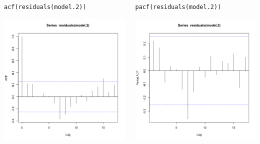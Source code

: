 \documentclass{beamer}
\begin{document}
\begin{frame}[fragile]{}
    \begin{columns}
        \begin{column}{0.5\textwidth}
            \begin{verbatim}
acf(residuals(model.2))
            \end{verbatim}
            \includegraphics[width=\textwidth]{lectures/day_4_GLS/figures/unnamed-chunk-40-1.png}
        \end{column}
        \begin{column}{0.5\textwidth}
            \begin{verbatim}
pacf(residuals(model.2))
            \end{verbatim}
            \includegraphics[width=\textwidth]{lectures/day_4_GLS/figures/unnamed-chunk-41-1.png}

\end{column}
\end{columns}
\end{frame}
\end{document}
